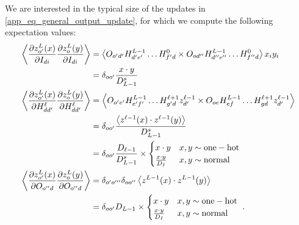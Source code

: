 \documentclass[11pt]{article}
\begin{document}
We are interested in the typical size of the updates in \eqref{app_eq_general_output_update}, for which
we compute the following expectation values:
\begin{align}
\left  \langle \frac{ \partial z ^{ L }_{ o' }(x) }{ \partial I_{ di } }\frac{ \partial z^{ L }_{ o }(y) }{ \partial I_{ di } }  \right \rangle &=\left  \langle O_{ o'd' }H^{ L-1 }_{d'e' } \ldots  H^{ 0 }_{  f'd }\times  O_{ od'' }H^{ L-1 }_{d''e'' } \ldots  H^{ 0 }_{  f''d }\right  \rangle x_{ i } y_{ i }\nonumber\\
  &= \delta_{ oo' }\frac{ x \cdot y }{ D^{ s }_{ L-1 } } \nonumber\\
\left  \langle \frac{ \partial z ^{ L }_{ o' }(x) }{ \partial H^{ \ell }_{ dd' } }\frac{ \partial z^{ L }_{ o }(y) }{ \partial H^{ \ell }_{ dd' } }  \right \rangle &= \left \langle O_{ o'e' }H^{ L-1 }_{e'f' } \ldots  H^{ \ell+1 }_{  g'd } z^{ \ell-1 }_{ d' }\times O_{ oe }H^{ L-1 }_{ef } \ldots  H^{ \ell+1 }_{  gd } z^{ \ell-1 }_{ d' } \right  \rangle \nonumber\\
  &= \delta_{ oo' } \frac{ \left\langle z^{ \ell-1 }(x)\cdot z^{ \ell-1 }(y) \right\rangle }{ D^{ s }_{ L-1 } }\nonumber\\
  &= \delta_{ oo' }  \frac{D_{ \ell-1 }}{ D^{ s }_{ L-1 } }\times \begin{cases} x\cdot y & x, y \sim {\rm one-hot}\\ \frac{ x\cdot y }{ D_{ I } } & x, y \sim {\rm normal}\end{cases}\nonumber\\
\left  \langle \frac{ \partial z ^{ L }_{ o' }(x) }{ \partial O_{ o''d } }\frac{ \partial z^{ L }_{ o }(y) }{ \partial O_{ o''d } }  \right \rangle &= \delta_{ o'o''' }\delta_{ oo'' } \left \langle z^{ L-1 }(x)\cdot z^{ L-1 }(y) \right  \rangle \nonumber\\
&= \delta_{ oo' } D_{ L-1 }\times \begin{cases} x\cdot y & x, y \sim {\rm one-hot}\\ \frac{ x\cdot y }{ D_{ I } } & x, y \sim {\rm normal}\end{cases}\ . \label{app_eq_mup_expectation_vals}
\end{align}
\end{document}
